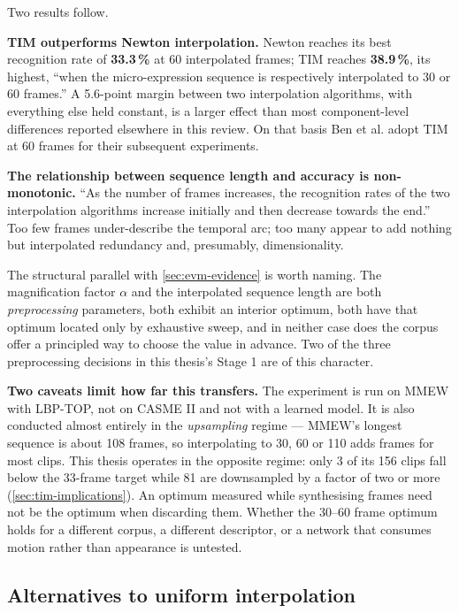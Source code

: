 Two results follow.

\textbf{TIM outperforms Newton interpolation.} Newton reaches its best recognition rate of \textbf{33.3\,\%} at 60 interpolated frames; TIM reaches \textbf{38.9\,\%}, its highest, ``when the micro-expression sequence is respectively interpolated to 30 or 60 frames.'' A 5.6-point margin between two interpolation algorithms, with everything else held constant, is a larger effect than most component-level differences reported elsewhere in this review. On that basis Ben et al. adopt TIM at 60 frames for their subsequent experiments.

\textbf{The relationship between sequence length and accuracy is non-monotonic.} ``As the number of frames increases, the recognition rates of the two interpolation algorithms increase initially and then decrease towards the end.'' Too few frames under-describe the temporal arc; too many appear to add nothing but interpolated redundancy and, presumably, dimensionality.

The structural parallel with \autoref{sec:evm-evidence} is worth naming. The magnification factor $\alpha$ and the interpolated sequence length are both \textit{preprocessing} parameters, both exhibit an interior optimum, both have that optimum located only by exhaustive sweep, and in neither case does the corpus offer a principled way to choose the value in advance. Two of the three preprocessing decisions in this thesis's Stage 1 are of this character.

\textbf{Two caveats limit how far this transfers.} The experiment is run on MMEW with LBP-TOP, not on CASME II and not with a learned model. It is also conducted almost entirely in the \textit{upsampling} regime --- MMEW's longest sequence is about 108 frames, so interpolating to 30, 60 or 110 adds frames for most clips. This thesis operates in the opposite regime: only 3 of its 156 clips fall below the 33-frame target while 81 are downsampled by a factor of two or more (\autoref{sec:tim-implications}). An optimum measured while synthesising frames need not be the optimum when discarding them. Whether the 30--60 frame optimum holds for a different corpus, a different descriptor, or a network that consumes motion rather than appearance is untested.

\subsection{Alternatives to uniform interpolation}
\label{sec:tim-keyframe}

